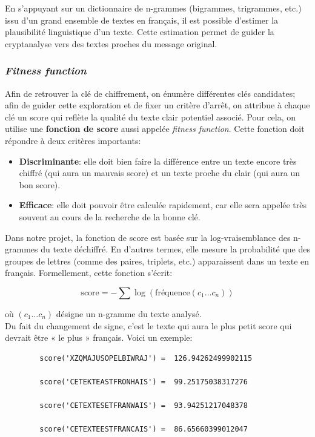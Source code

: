 \documentclass[a4paper]{article}
\begin{document}
En s’appuyant sur un dictionnaire de n-grammes (bigrammes, trigrammes, etc.) issu d’un grand ensemble de textes en français, il est possible d’estimer la plausibilité linguistique d’un texte. Cette estimation permet de guider la cryptanalyse vers des textes proches du message original.

\subsubsection{\textit{Fitness function}}

Afin de retrouver la clé de chiffrement, on énumère différentes clés candidates; afin de guider cette exploration et de fixer un critère d'arrêt, on attribue à chaque clé un score qui reflète la qualité du texte clair potentiel associé.
Pour cela, on utilise une \textbf{fonction de score} aussi appelée \textit{fitness function}. Cette fonction doit répondre à deux critères importants:

\begin{itemize}
    \item \textbf{Discriminante}: elle doit bien faire la différence entre un texte encore très chiffré (qui aura un mauvais score) et un texte proche du clair (qui aura un bon score).
    \item \textbf{Efficace}: elle doit pouvoir être calculée rapidement, car elle sera appelée très souvent au cours de la recherche de la bonne clé.
\end{itemize}

Dans notre projet, la fonction de score est basée sur la log-vraisemblance des n-grammes du texte déchiffré. En d’autres termes, elle mesure la probabilité que des groupes de lettres (comme des paires, triplets, etc.) apparaissent dans un texte en français. Formellement, cette fonction s’écrit:

\[
\text{score} = - \sum \log\left(\text{fréquence}(c_1 \ldots c_n)\right)
\]

où $(c_1 \ldots c_n)$ désigne un n-gramme du texte analysé.\\

Du fait du changement de signe, c'est le texte qui aura le plus petit score qui devrait être « le plus » français. Voici un exemple:

\begin{verbatim}
        score('XZQMAJUSOPELBIWRAJ') =  126.94262499902115

        score('CETEKTEASTFRONHAIS') =  99.25175038317276

        score('CETEXTESETFRANWAIS') =  93.94251217048378

        score('CETEXTEESTFRANCAIS') =  86.65660399012047
\end{verbatim}
\end{document}
